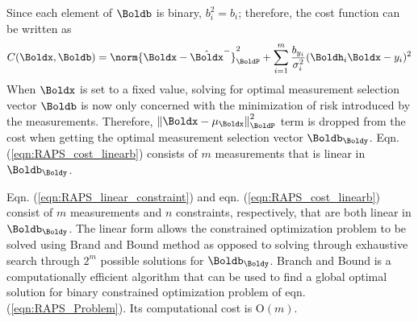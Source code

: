 Since each element of $\Boldb$ is binary, $b_i^2=b_i$; therefore, the cost function can be written as
\begin{equation} \label{eqn:RAPS_cost_linearb}
	C(\Boldx,\Boldb) = \norm{ \Boldx - \hat{\Boldx}^-}_{\BoldP}^2 
	+   \sum_{i=1}^{m} \frac{b_{y_i}}{\sigma_i^2} (\Boldh_i \Boldx- y_i)^2 
\end{equation}
When $\Boldx$ is set to a fixed value, solving for optimal measurement selection vector $\Boldb$ is now only concerned with the minimization of risk introduced by the measurements. 
Therefore, ${\Vert \Boldx - \mu_{\Boldx} \Vert }^2_{\BoldP}$ term is dropped from the cost when getting the optimal measurement selection vector $\Boldb_{\Boldy}$. 
Eqn. (\ref{eqn:RAPS_cost_linearb}) consists of $m$ measurements that is linear in $\Boldb_{\Boldy}$.

Eqn. (\ref{eqn:RAPS_linear_constraint}) and eqn. (\ref{eqn:RAPS_cost_linearb}) consist of $m$ measurements and $n$ constraints, respectively, that are both linear in $\Boldb_{\Boldy}$. 
The linear form allows the constrained optimization problem to be solved using Brand and Bound method as opposed to solving through exhaustive search through $2^m$ possible solutions for $\Boldb_{\Boldy}$. 
Branch and Bound \cite{landautomatic,lawler1966branch} is a computationally efficient algorithm that can be used to find a global optimal solution for binary constrained optimization problem of eqn. (\ref{eqn:RAPS_Problem}). 
{\color{green} Its computational cost is O$(m)$.}
